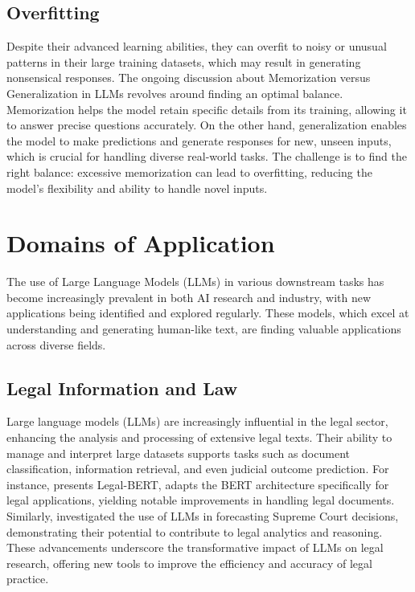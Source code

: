 \subsection{Overfitting}
Despite their advanced learning abilities, they can overfit to noisy or unusual patterns in their large training datasets, which may result in generating nonsensical responses. The ongoing discussion about Memorization versus Generalization in LLMs revolves around finding an optimal balance. Memorization helps the model retain specific details from its training, allowing it to answer precise questions accurately. On the other hand, generalization enables the model to make predictions and generate responses for new, unseen inputs, which is crucial for handling diverse real-world tasks. The challenge is to find the right balance: excessive memorization can lead to overfitting, reducing the model's flexibility and ability to handle novel inputs.

\section{Domains of Application}
The use of Large Language Models (LLMs) in various downstream tasks has become increasingly prevalent in both AI research and industry, with new applications being identified and explored regularly. These models, which excel at understanding and generating human-like text, are finding valuable applications across diverse fields. 
\subsection{Legal Information and Law}
Large language models (LLMs) are increasingly influential in the legal sector, enhancing the analysis and processing of extensive legal texts. Their ability to manage and interpret large datasets supports tasks such as document classification, information retrieval, and even judicial outcome prediction. For instance, \cite{Chalk2020} presents Legal-BERT, adapts the BERT architecture specifically for legal applications, yielding notable improvements in handling legal documents. Similarly, \cite{Bommarito2018} investigated the use of LLMs in forecasting Supreme Court decisions, demonstrating their potential to contribute to legal analytics and reasoning. These advancements underscore the transformative impact of LLMs on legal research, offering new tools to improve the efficiency and accuracy of legal practice.

